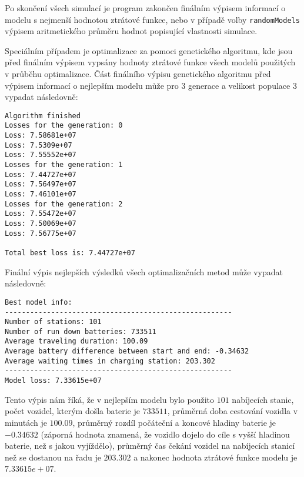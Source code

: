 Po skončení všech simulací je program zakončen finálním výpisem informací o
modelu s nejmenší hodnotou ztrátové funkce, nebo v případě volby 
\texttt{randomModels} výpisem aritmetického průměru hodnot popisující vlastnosti simulace.

Speciálním případem je optimalizace za pomoci genetického algoritmu, kde jsou
před finálním výpisem vypsány hodnoty ztrátové funkce všech modelů použitých v průběhu
optimalizace. Část finálního výpisu genetického algoritmu před výpisem informací o nejlepším
modelu může pro 3 generace a velikost populace 3 vypadat následovně:

\begin{Verbatim}
Algorithm finished
Losses for the generation: 0
Loss: 7.58681e+07
Loss: 7.5309e+07
Loss: 7.55552e+07
Losses for the generation: 1
Loss: 7.44727e+07
Loss: 7.56497e+07
Loss: 7.46101e+07
Losses for the generation: 2
Loss: 7.55472e+07
Loss: 7.50069e+07
Loss: 7.56775e+07

Total best loss is: 7.44727e+07
\end{Verbatim}

Finální výpis nejlepších výsledků všech optimalizačních metod může vypadat následovně:

\begin{Verbatim}
Best model info:
------------------------------------------------------
Number of stations: 101
Number of run down batteries: 733511
Average traveling duration: 100.09
Average battery difference between start and end: -0.34632
Average waiting times in charging station: 203.302
------------------------------------------------------
Model loss: 7.33615e+07
\end{Verbatim}

Tento výpis nám říká, že v nejlepším modelu bylo použito $101$ nabíjecích stanic,
počet vozidel, kterým došla baterie je $733511$, průměrná doba cestování vozidla
v minutách je $100.09$, průměrný rozdíl počáteční a koncové hladiny baterie je 
$-0.34632$ (záporná hodnota znamená, že vozidlo dojelo do cíle s vyšší hladinou
baterie, než s jakou vyjíždělo), průměrný čas čekání vozidel na nabíjecích stanicí
než se dostanou na řadu je $203.302$ a nakonec hodnota ztrátové funkce modelu
je $7.33615e+07$.